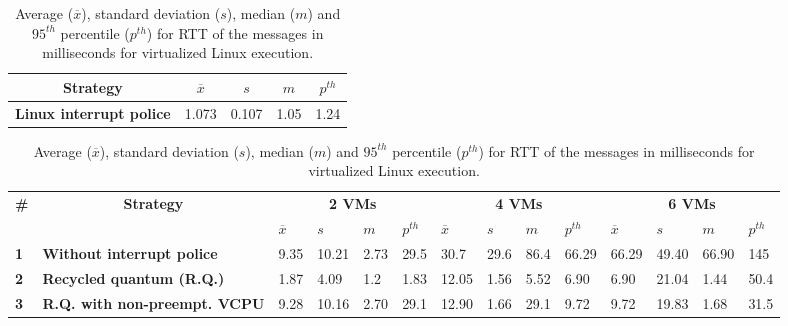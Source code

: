 \begin{table}
\centering
\caption{Average ($\overline{x}$), standard deviation ($s$), median ($m$) and $95^{th}$ percentile ($p^{th}$) for RTT of the messages in milliseconds for Linux native execution.}
\label{table:delaylinux}
\begin{tabular}{lllll}
\hline \hline
\multicolumn{1}{c}{\textbf{Strategy}} & \multicolumn{1}{c}{\textbf{$\overline{x}$}} & \multicolumn{1}{c}{\textbf{$s$}} & \multicolumn{1}{c}{\textbf{$m$}} & \multicolumn{1}{c}{\textbf{$p^{th}$}} \\ \hline
\textbf{Linux interrupt police}       & 1.073                          & 0.107                          & 1.05                           & 1.24                           \\ \hline
\end{tabular}
\vspace{2\baselineskip}
\caption{Average ($\overline{x}$), standard deviation ($s$), median ($m$) and $95^{th}$ percentile ($p^{th}$) for RTT of the messages in milliseconds for virtualized Linux execution.}
\label{table:delay}
\begin{tabular}{llllllllllllll}
\hline \hline
\multirow{2}{*}{\textbf{\#}} & \multicolumn{1}{c}{\multirow{2}{*}{\textbf{Strategy}}} & \multicolumn{4}{c}{\textbf{2 VMs}}                & \multicolumn{4}{c}{\textbf{4 VMs}}                & \multicolumn{4}{c}{\textbf{6 VMs}}                \\ \cline{3-14} 
                             & \multicolumn{1}{c}{}                                   & \textbf{$\overline{x}$} & \textbf{$s$} & \textbf{$m$} & \textbf{$p^{th}$} & \textbf{$\overline{x}$} & \textbf{$s$} & \textbf{$m$} & \textbf{$p^{th}$} & \textbf{$\overline{x}$} & \textbf{$s$} & \textbf{$m$} & \textbf{$p^{th}$} \\ \hline
\textbf{1}                   & \textbf{Without interrupt police}                      & 9.35       & 10.21      & 2.73       & 29.5       & 30.7       & 29.6       & 86.4       & 66.29      & 66.29      & 49.40      & 66.90      & 145        \\
\textbf{2}                   & \textbf{Recycled quantum (R.Q.)}                      & 1.87       & 4.09       & 1.2        & 1.83       & 12.05      & 1.56       & 5.52       & 6.90       & 6.90       & 21.04      & 1.44       & 50.4       \\
\textbf{3}                   & \textbf{R.Q. with non-preempt. VCPU}                   & 9.28       & 10.16      & 2.70       & 29.1       & 12.90      & 1.66       & 29.1       & 9.72       & 9.72       & 19.83      & 1.68       & 31.5       \\

\end{tabular}
\end{table}
